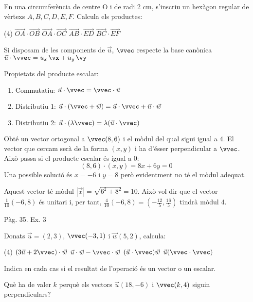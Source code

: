 \documentclass[11pt, a4paper, pdf]{article}
\renewcommand{\hot}[1][]{
	\ifthenelse{\equal{#1}{}}{$\mathbf{\bigstar}$ LLIBRE $\mathbf{\bigstar}$: }{\myrepeat{#1}{$\mathbf{\bigstar}$}}
}
\begin{document}
 \begin{mylist}
 	\item En una circumferència de centre O i de radi 2 cm, s'inscriu un hexàgon regular de vèrtexs $A, B, C, D, E, F$. Calcula els productes:
 	\begin{tasks}(4)
 		\task $\overrightarrow{OA}\cdot \overrightarrow{OB}$
 		\task $\overrightarrow{OA}\cdot \overrightarrow{OC}$ 
 		\task  $\overrightarrow{AB}\cdot \overrightarrow{ED}$
 		\task $\overrightarrow{BC}\cdot \overrightarrow{EF}$
 	\end{tasks}
 	
 \end{mylist}
 
 \begin{theorybox}
 	Si disposam de les components  de $\vec u$, $\vvec$ respecte la base canònica
$\vec u \cdot \vvec= u_x \, \vx + u_y\, \vy$

 	Propietats del producte escalar:
 	\begin{enumerate}
 		\item Commutatiu: $\vec u \cdot \vvec = \vvec\cdot \vec u$
 		\item Distributiu 1: $\vec u \cdot (\vvec+ \vec w) = \vec u \cdot \vvec+ \vec u \cdot \vec w$	
 		\item Distributiu 2: $\vec u \cdot (\lambda \vvec) = \lambda (\vec u \cdot \vvec)$
 	\end{enumerate}
 \end{theorybox}
 
 \begin{resolt}[E]{Obté un vector ortogonal a $\vvec(8,6)$ i el mòdul del qual sigui igual a 4.}
 	El vector que cercam serà de la forma $(x,y)$ i ha d'ésser perpendicular a $\vvec$. Això passa si el producte escalar és igual a 0:
 	\begin{equation*}
 	(8,6)\cdot(x,y)=8x+6y=0
 	\end{equation*}
 	Una possible solució és $x=-6$ i $y=8$ però evidentment no té el mòdul adequat. 
 	
 	Aquest vector té mòdul  $|\vec x|=\sqrt{6^2+8^2}=10$. Això vol dir que el vector $\frac{1}{10}(-6,8)$ és unitari i, per tant,  $\frac{4}{10}(-6,8)=(-\frac{12}{5}, \frac{16}{5})$ tindrà mòdul 4.
 \end{resolt}

\hot Pàg. 35. Ex. 3

\begin{mylist}
		\item Donats $\vec u =(2,3)$, $\vvec (-3,1)$ i $\vec w(5,2)$, calcula:
	\begin{tasks}(4)
		\task $(3\vec u + 2 \vvec) \cdot \vec w$
		\task $\vec u \cdot \vec w - \vvec \cdot \vec w$
		\task $(\vec u \cdot \vvec)\vec w$
		\task $\vec u (\vvec\cdot \vvec)$
	\end{tasks}
	Indica en cada cas si el resultat de l'operació és un vector o un escalar.
	
 	
	\item Què ha de valer $k$ perquè els vectors $\vec u(18, -6)$ i $\vvec(k, 4)$ siguin perpendiculars?
\end{mylist}
\end{document}
